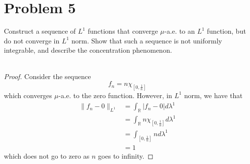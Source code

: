 \documentclass[fontsize=11pt]{scrartcl} %
\numberwithin{equation}{section} %
\numberwithin{figure}{section} %
\numberwithin{table}{section} %
\newcommand{\R}{\mathbb{R}}
\begin{document}

\section*{Problem 5}
Construct a sequence of $L^1$ functions that converge $\mu$-a.e. to an $L^1$
function, but do not converge in $L^1$ norm. Show that such a sequence is not
uniformly integrable, and describe the concentration phenomenon.
\\
\\
\begin{proof}
    Consider the sequence
    \[
        f_n = n\chi_{[0,\frac{1}{n}]}
    \]
    which converges $\mu$-a.e. to the zero function. However, in $L^1$ norm, we
    have that
    \[
        \begin{aligned}
            \|f_n-0\|_{L^1} &= \int_{\R}|f_n-0|d\lambda^1\\
                            &= \int_{\R}n\chi_{[0,\frac{1}{n}]}d\lambda^1\\
                            &= \int_{[0,\frac{1}{n}]}nd\lambda^1\\
                            &=1
        \end{aligned}
    \]
    which does not go to zero as $n$ goes to infinity.

\end{proof}
\end{document}
